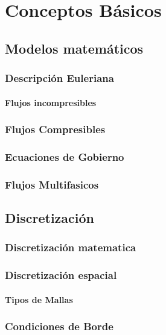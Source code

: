 \chapter{Conceptos Básicos}

\section{Modelos matemáticos}
	\subsection{Descripción Euleriana}
		\subsubsection{Flujos incompresibles}
	\subsection{Flujos Compresibles}%
	\subsection{Ecuaciones de Gobierno}
	\subsection{Flujos Multifasicos}%
	
\section{Discretización}
	\subsection{Discretización matematica}
	\subsection{Discretización espacial}
		\subsubsection{Tipos de Mallas}
	\subsection{Condiciones de Borde}
